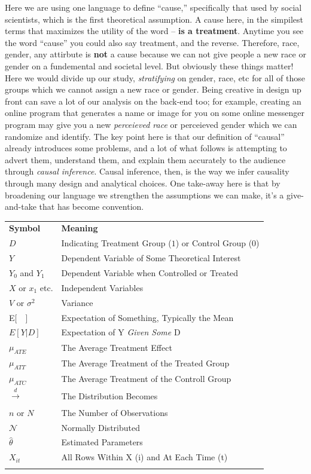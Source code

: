 \documentclass[12pt]{article}\usepackage[]{graphicx}\usepackage[]{color}
\begin{document}
\begin{flushleft}
Here we are using one language to define ``cause,'' specifically that used by social scientists, which is the first theoretical assumption. A cause here, in the simpilest terms that maximizes the utility of the word -- \textbf{is a treatment}. Anytime you see the word ``cause'' you could also say treatment, and the reverse. Therefore, race, gender, any attirbute is \textbf{not} a cause because we can not give people a new race or gender on a fundemental and societal level. But obviously these things matter! Here we would divide up our study, \textit{stratifying} on gender, race, etc for all of those groups which we cannot assign a new race or gender. Being creative in design up front can save a lot of our analysis on the back-end too; for example, creating an online program that generates a name or image for you on some online messenger program may give you a new \textit{perceieved race} or {perceieved gender} which we can randomize and identify. The key point here is that our definition of ``causal'' already introduces some problems, and a lot of what follows is attempting to advert them, understand them, and explain them accurately to the audience through \textit{causal inference}. Causal inference, then, is the way we infer causality through many design and analytical choices. One take-away here is that by broadening our language we strengthen the assumptions we can make, it's a give-and-take that has become convention. 

\begin{longtable}{ll}
\hline\noalign{\smallskip}
\textbf{Symbol} & \textbf{Meaning} \\
\noalign{\smallskip}\hline\noalign{\smallskip}
$D$ & Indicating Treatment Group ($1$) or Control Group ($0$)\\
$Y$ & Dependent Variable of Some Theoretical Interest        \\
$Y_0$ and $Y_1$ & Dependent Variable when Controlled or Treated\\
$X$ or $x_1$ etc. & Independent Variables\\
$V$ or $\sigma^2$ & Variance\\
E[~~]  & Expectation of Something, Typically the Mean\\
$E[Y |D]$ & Expectation of Y \textit{Given Some} D\\
$\mu_{ATE}$ & The Average Treatment Effect\\
$\mu_{ATT}$ & The Average Treatment of the Treated Group\\
$\mu_{ATC}$ & The Average Treatment of the Controll Group\\
$\xrightarrow[]{d}$ & The Distribution Becomes\\
$n$ or $N$ & The Number of Observations\\
$\mathcal{N}$ & Normally Distributed\\
$\hat{\theta}$ & Estimated Parameters\\
$X_{it}$ & All Rows Within X (i) and At Each Time (t)\\
\noalign{\smallskip}\hline\noalign{\smallskip}
\end{longtable}



\end{flushleft}
\end{document}
